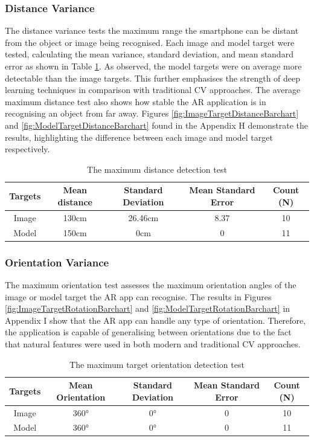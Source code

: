 \documentclass{aifyp}
\begin{document}
\subsubsection{Distance Variance}
The distance variance tests the maximum range the smartphone can be distant from the object or image being recognised. Each image and model target were tested, calculating the mean variance, standard deviation, and mean standard error as shown in Table \ref{tab:DistanceVarianceTable}. As observed, the model targets were on average more detectable than the image targets. This further emphasises the strength of deep learning techniques in comparison with traditional CV approaches. The average maximum distance test also shows how stable the AR application is in recognising an object from far away. Figures \ref{fig:ImageTargetDistanceBarchart} and \ref{fig:ModelTargetDistanceBarchart} found in the Appendix H demonstrate the results, highlighting the difference between each image and model target respectively.
\begin{table}[h]
\begin{center}
\begin{tabular}{|c|c|c|c|c|}
\hline
\textbf{Targets} & \textbf{Mean distance} & \textbf{Standard Deviation} & \textbf{Mean Standard Error} & \textbf{Count (N)} \\ \hline
Image & 130cm & 26.46cm & 8.37 & 10\\ \hline
Model & 150cm & 0cm & 0 & 11\\ \hline
\end{tabular}
\caption{The maximum distance detection test }
\label{tab:DistanceVarianceTable}
\end{center}
\end{table}

\subsubsection{Orientation Variance}
The maximum orientation test assesses the maximum orientation angles of the image or model target the AR app can recognise. The results in Figures \ref{fig:ImageTargetRotationBarchart} and \ref{fig:ModelTargetRotationBarchart} in Appendix I show that the AR app can handle any type of orientation. Therefore, the application is capable of generalising between orientations due to the fact that natural features were used in both modern and traditional CV approaches.
\begin{table}[h]
\begin{center}
\begin{tabular}{|c|c|c|c|c|}
\hline
\textbf{Targets} & \textbf{Mean Orientation} & \textbf{Standard Deviation} & \textbf{Mean Standard Error} & \textbf{Count (N)} \\ \hline
Image & 360\si{\degree} & 0\si{\degree} & 0 & 10\\ \hline
Model & 360\si{\degree} & 0\si{\degree} & 0 & 11\\ \hline
\end{tabular}
\caption{The maximum target orientation detection test }
\label{tab:RotationVarianceTable}
\end{center}
\end{table}
\end{document}
